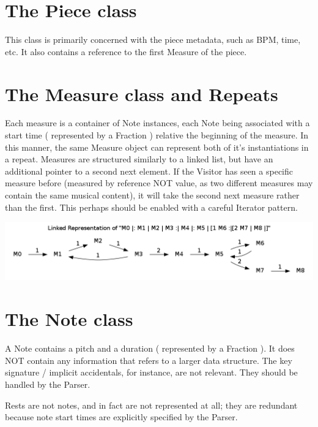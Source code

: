 \documentclass{amsart}
\begin{document}
\section{ The Piece class }

This class is primarily concerned with the piece metadata, such as BPM, time, etc. It also contains a reference to the first Measure of the piece.

\section{ The Measure class and Repeats }

Each measure is a container of Note instances, each Note being associated with a start time ( represented by a Fraction ) relative the beginning of the measure. In this manner, the same Measure object can represent both of it's instantiations in a repeat. Measures are structured similarly to a linked list, but have an additional pointer to a second next element. If the Visitor has seen a specific measure before (measured by reference NOT value, as two different measures may contain the same musical content), it will take the second next measure rather than the first. This perhaps should be enabled with a careful Iterator pattern.

\includegraphics[width=\linewidth]{measure_example.png}

\section{ The Note class }
A Note contains a pitch and a duration  ( represented by a Fraction ).  It does NOT contain any information that refers to a larger data structure. The key signature / implicit accidentals, for instance, are not relevant. They should be handled by the Parser.

Rests are not notes, and in fact are not represented at all; they are redundant because note start times are explicitly specified by the Parser.
\end{document}
